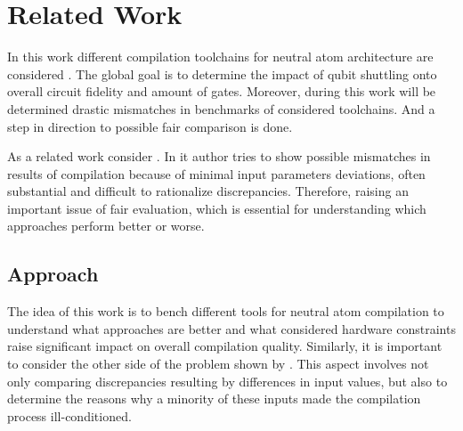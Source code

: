 
\chapter{Related Work}\label{chapter:relatedwork}
In this work different compilation toolchains for neutral atom architecture are considered \parencite{huang2025dasatomdivideandshuttleatomapproach,Tan_2025_Enola, schmid2023hybridcircuitmappingleveraging}.
The global goal is to determine the impact of qubit shuttling onto overall circuit fidelity and amount of gates.
Moreover, during this work will be determined drastic mismatches in benchmarks of considered toolchains. 
And a step in direction to possible fair comparison is done.

As a related work consider \parencite{gao2025optimalcompilationstrategiesqft}.
In it author tries to show possible mismatches in results of compilation because of minimal input parameters deviations, 
often substantial and difficult to rationalize discrepancies. 
Therefore, raising an important issue of fair evaluation, 
which is essential for understanding which approaches perform better or worse.

\section{Approach}
The idea of this work is to bench different tools for neutral atom compilation to understand what approaches are better 
and what considered hardware constraints raise significant impact on overall compilation quality.
Similarly, it is important to consider the other side of the problem shown by \parencite{gao2025optimalcompilationstrategiesqft}.
This aspect involves not only comparing discrepancies resulting by differences in input values, 
but also to determine the reasons why a minority of these inputs made the compilation process ill-conditioned.